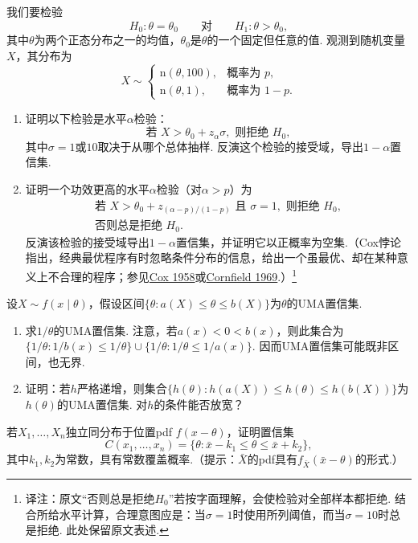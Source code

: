 \begin{exercise}[Cox悖论]\label{exercise:9.49}
我们要检验
$$H_0:\theta=\theta_0\qquad\text{对}\qquad H_1:\theta>\theta_0,$$
其中$\theta$为两个正态分布之一的均值，$\theta_0$是$\theta$的一个固定但任意的值. 观测到随机变量$X$，其分布为
$$X\sim\begin{cases}\mathrm n(\theta,100),&\text{概率为 }p,\\\mathrm n(\theta,1),&\text{概率为 }1-p.\end{cases}$$
\begin{enumerate}
\item 证明以下检验是水平$\alpha$检验：
$$\text{若 }X>\theta_0+z_\alpha\sigma,\text{ 则拒绝 }H_0,$$
其中$\sigma=1$或$10$取决于从哪个总体抽样. 反演这个检验的接受域，导出$1-\alpha$置信集.
\item 证明一个功效更高的水平$\alpha$检验（对$\alpha>p$）为
$$\begin{gathered}
\text{若 }X>\theta_0+z_{(\alpha-p)/(1-p)}\text{ 且 }\sigma=1,\text{ 则拒绝 }H_0,\\
\text{否则总是拒绝 }H_0.
\end{gathered}$$
反演该检验的接受域导出$1-\alpha$置信集，并证明它以正概率为空集.（Cox悖论指出，经典最优程序有时忽略条件分布的信息，给出一个虽最优、却在某种意义上不合理的程序；参见\hyperref[bib:source84]{Cox 1958}或\hyperref[bib:source83]{Cornfield 1969}.）\footnote{译注：原文“否则总是拒绝$H_0$”若按字面理解，会使检验对全部样本都拒绝. 结合所给水平计算，合理意图应是：当$\sigma=1$时使用所列阈值，而当$\sigma=10$时总是拒绝. 此处保留原文表述.}
\end{enumerate}
\end{exercise}
\begin{exercise}\label{exercise:9.50}
设$X\sim f(x\mid\theta)$，假设区间$\{\theta:a(X)\le\theta\le b(X)\}$为$\theta$的UMA置信集.
\begin{enumerate}
\item 求$1/\theta$的UMA置信集. 注意，若$a(x)<0<b(x)$，则此集合为$\{1/\theta:1/b(x)\le1/\theta\}\cup\{1/\theta:1/\theta\le1/a(x)\}$. 因而UMA置信集可能既非区间，也无界.
\item 证明：若$h$严格递增，则集合$\{h(\theta):h(a(X))\le h(\theta)\le h(b(X))\}$为$h(\theta)$的UMA置信集. 对$h$的条件能否放宽？
\end{enumerate}
\end{exercise}
\begin{exercise}\label{exercise:9.51}
若$X_1,\ldots,X_n$独立同分布于位置pdf $f(x-\theta)$，证明置信集
$$C(x_1,\ldots,x_n)=\{\theta:\bar x-k_1\le\theta\le\bar x+k_2\},$$
其中$k_1,k_2$为常数，具有常数覆盖概率.（提示：$\bar X$的pdf具有$f_{\bar X}(\bar x-\theta)$的形式.）
\end{exercise}
